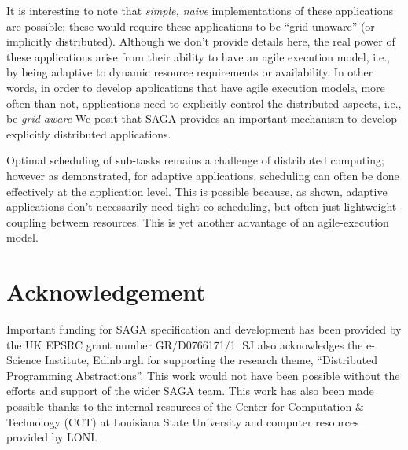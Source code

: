 \documentclass{llncs}
\begin{document}

It is interesting to note that {\it simple, naive} implementations of
these applications are possible; these would require these
applications to be ``grid-unaware'' (or implicitly distributed).
Although we don't provide details here, the real power of these
applications arise from their ability to have an agile execution
model, i.e., by being adaptive to dynamic resource requirements or
availability. In other words, in order to develop applications that
have agile execution models, more often than not, applications need to
explicitly control the distributed aspects, i.e., be {\it grid-aware}
We posit that SAGA provides an important mechanism to develop
explicitly distributed applications.


Optimal scheduling of sub-tasks remains a challenge of distributed
computing; however as demonstrated, for adaptive applications,
scheduling can often be done effectively at the application level.
This is possible because, as shown, adaptive applications don't
necessarily need tight co-scheduling, but often just
lightweight-coupling between resources. This is yet another advantage
of an agile-execution model.



\up\upp

\section*{Acknowledgement}

\upp

Important funding for SAGA specification and development has been
provided by the UK EPSRC grant number GR/D0766171/1.  SJ also
acknowledges the e-Science Institute, Edinburgh for supporting the
research theme, ``Distributed Programming Abstractions''. This work
would not have been possible without the efforts and support of the
wider SAGA team. This work has also been made possible thanks to the
internal resources of the Center for Computation \& Technology (CCT)
at Louisiana State University and computer resources provided by LONI.

\up\upp



\end{document}
